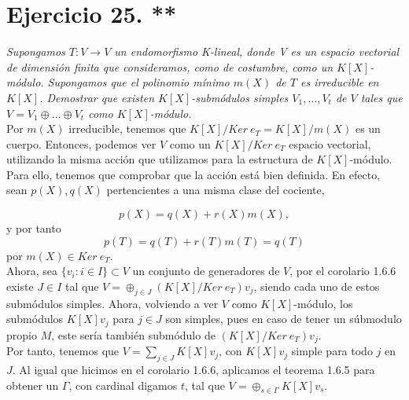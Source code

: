 \section{Ejercicio 25. **}
\textit{Supongamos \(T:V \rightarrow V\) un endomorfismo K-lineal, donde V es un espacio vectorial de dimensión finita que consideramos, como de costumbre, como un \(K[X]\)-módulo. Supongamos que el polinomio mínimo  \(m(X)\) de  \(T\) es irreducible en  \(K[X]\). Demostrar que existen  \(K[X]\)-submódulos simples \(V_1, \dots, V_t\) de \(V\) tales que  \(V = V_1 \oplus \dots \oplus V_t\) como \(K[X]\)-módulo.} \\

Por \(m(X)\) irreducible, tenemos que \(K[X]/Ker\ e_T = K[X]/m(X)\) es un cuerpo. Entonces, podemos ver \(V\) como un \(K[X]/Ker\ e_T\) espacio vectorial, utilizando la misma acción que utilizamos para la estructura de \(K[X]\)-módulo. Para ello, tenemos que comprobar que la acción está bien definida. En efecto, sean \(p(X), q(X)\) pertencientes a una misma clase del cociente,

\[
p(X) = q(X) + r(X)m(X)
,\]
y por tanto
\[
p(T) = q(T) + r(T)m(T) = q(T)
\]
por \(m(X) \in Ker\ e_T\).\\

Ahora, sea \(\{v_i : i \in I\} \subset V\) un conjunto de generadores de \(V\), por el corolario 1.6.6 existe \(J \in I\) tal que \(V = \oplus_{j \in J} (K[X]/Ker\ e_T)v_j\), siendo cada uno de estos submódulos simples. Ahora, volviendo a ver \(V\) como  \(K[X]\)-módulo, los submódulos \(K[X]v_j\) para \(j \in J\) son simples, pues en caso de tener un súbmodulo propio \(M\), este sería también submódulo de \((K[X]/Ker\ e_T)v_j\).\\

Por tanto, tenemos que \(V = \sum_{j \in J} K[X]v_j\), con \(K[X] v_j\) simple para todo \(j\) en  \(J\). Al igual que hicimos en el corolario 1.6.6, aplicamos el teorema 1.6.5 para obtener un \(\Gamma\), con cardinal digamos \(t\), tal que  \(V = \oplus_{s \in \Gamma}K[X]v_s\).
